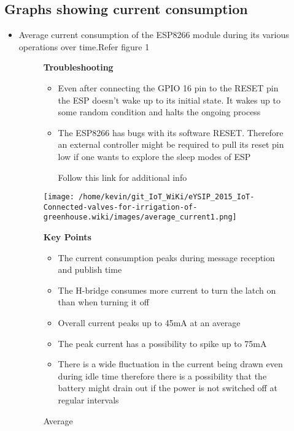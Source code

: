 \documentclass[16pt]{article}
\begin{document}
\vspace{0.5cm}
\subsection{Graphs showing current
consumption}

\begin{itemize}

\item
  Average current consumption of the ESP8266 module during its various
  operations over time.Refer figure 1 


\begin{figure}

\textbf{Troubleshooting}

\vspace{0.2cm}
\begin{itemize}
\item
  Even after connecting the GPIO 16 pin to the RESET pin the ESP doesn't
  wake up to its initial state. It wakes up to some random condition and
  halts the ongoing process
\item
  The ESP8266 has bugs with its software RESET. Therefore an external
  controller might be required to pull its reset pin low if one wants to
  explore the sleep modes of ESP
  
  Follow this link for additional info
\end{itemize}
\texttt{[image: /home/kevin/git\_IoT\_WiKi/eYSIP\_2015\_IoT-Connected-valves-for-irrigation-of-greenhouse.wiki/images/average\_current1.png]}
\caption{Average}
\textbf{Key Points}

  \begin{itemize}

  \item
    The current consumption peaks during message reception and publish
    time
  \item
    The H-bridge consumes more current to turn the latch on than when
    turning it off
  \item
    Overall current peaks up to 45mA at an average
  \item
    The peak current has a possibility to spike up to 75mA
  \item
    There is a wide fluctuation in the current being drawn even during
    idle time therefore there is a possibility that the battery might
    drain out if the power is not switched off at regular intervals
  \end{itemize}
\end{figure}



\end{itemize}
\end{document}
